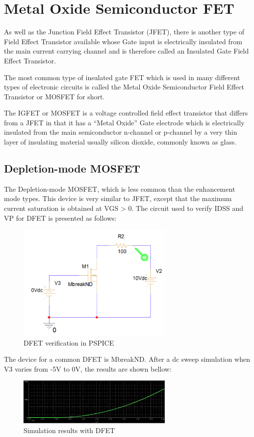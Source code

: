 \section{Metal Oxide Semiconductor FET}
As well as the Junction Field Effect Transistor (JFET), there is another type of Field Effect Transistor available whose Gate input is electrically insulated from the main current carrying channel and is therefore called an Insulated Gate Field Effect Transistor.

The most common type of insulated gate FET which is used in many different types of electronic circuits is called the Metal Oxide Semiconductor Field Effect Transistor or MOSFET for short.

The IGFET or MOSFET is a voltage controlled field effect transistor that differs from a JFET in that it has a “Metal Oxide” Gate electrode which is electrically insulated from the main semiconductor n-channel or p-channel by a very thin layer of insulating material usually silicon dioxide, commonly known as glass.
\subsection{Depletion-mode MOSFET}
The Depletion-mode MOSFET, which is less common than the enhancement mode types. This device is very similar to JFET, except that the maximum current saturation is obtained at VGS > 0.  The circuit used to verify IDSS and VP for DFET is presented as follows:
\begin{figure}[!htp]
    \centering
    \includegraphics[width = 3in]{graphics/ex2/f1.png}
    \caption{DFET verification in PSPICE}
    \label{dfet_1}
\end{figure}
\pagebreak
The device for a common DFET is MbreakND. After a dc sweep simulation when V3 varies from -5V to 0V, the results are shown bellow:
\begin{figure}[!htp]
    \centering
    \includegraphics[width = 3in]{graphics/ex2/f2.png}
    \caption{Simulation results with DFET}
    \label{dfet_2}
\end{figure}

